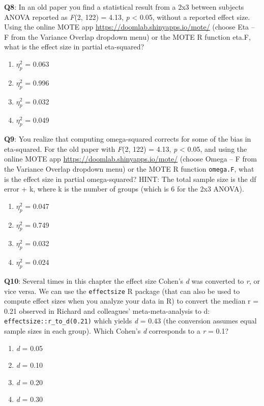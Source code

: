 \documentclass[
  oneside]{book}
\providecommand{\tightlist}{%
  \setlength{\itemsep}{0pt}\setlength{\parskip}{0pt}}
\begin{document}
\textbf{Q8}: In an old paper you find a statistical result from a 2x3 between subjects ANOVA reported as \emph{F}(2, 122) = 4.13, \emph{p} \textless{} 0.05, without a reported effect size. Using the online MOTE app \url{https://doomlab.shinyapps.io/mote/} (choose Eta -- F from the Variance Overlap dropdown menu) or the MOTE R function eta.F, what is the effect size in partial eta-squared?

\begin{enumerate}
\def\labelenumi{\Alph{enumi})}
\tightlist
\item
  \(\eta_p^2\) = 0.063
\item
  \(\eta_p^2\) = 0.996
\item
  \(\eta_p^2\) = 0.032
\item
  \(\eta_p^2\) = 0.049
\end{enumerate}

\textbf{Q9}: You realize that computing omega-squared corrects for some of the bias in eta-squared. For the old paper with \emph{F}(2, 122) = 4.13, \emph{p} \textless{} 0.05, and using the online MOTE app \url{https://doomlab.shinyapps.io/mote/} (choose Omega -- F from the Variance Overlap dropdown menu) or the MOTE R function \texttt{omega.F}, what is the effect size in partial omega-squared? HINT: The total sample size is the df error + k, where k is the number of groups (which is 6 for the 2x3 ANOVA).

\begin{enumerate}
\def\labelenumi{\Alph{enumi})}
\tightlist
\item
  \(\eta_p^2\) = 0.047
\item
  \(\eta_p^2\) = 0.749
\item
  \(\eta_p^2\) = 0.032
\item
  \(\eta_p^2\) = 0.024
\end{enumerate}

\textbf{Q10}: Several times in this chapter the effect size Cohen's \emph{d} was converted to \emph{r}, or vice versa. We can use the \texttt{effectsize} R package (that can also be used to compute effect sizes when you analyze your data in R) to convert the median r = 0.21 observed in Richard and colleagues' meta-meta-analysis to d: \texttt{effectsize::r\_to\_d(0.21)} which yields \emph{d} = 0.43 (the conversion assumes equal sample sizes in each group). Which Cohen's \emph{d} corresponds to a \emph{r} = 0.1?

\begin{enumerate}
\def\labelenumi{\Alph{enumi})}
\tightlist
\item
  \emph{d} = 0.05
\item
  \emph{d} = 0.10
\item
  \emph{d} = 0.20
\item
  \emph{d} = 0.30
\end{enumerate}
\end{document}
